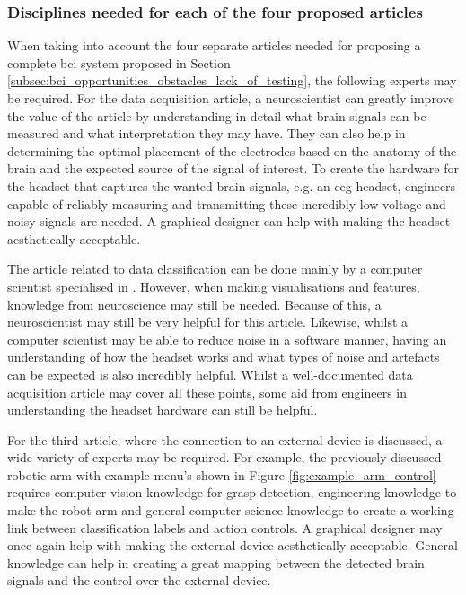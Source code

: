 
\subsubsection{Disciplines needed for each of the four proposed articles}
\label{subsubsec:bci_opportunities_obstacles_interdisciplinary_four_articles}


When taking into account the four separate articles needed for proposing a complete \gls{bci} system proposed in Section \ref{subsec:bci_opportunities_obstacles_lack_of_testing}, the following experts may be required.
For the data acquisition article, a neuroscientist can greatly improve the value of the article by understanding in detail what brain signals can be measured and what interpretation they may have.
They can also help in determining the optimal placement of the electrodes based on the anatomy of the brain and the expected source of the signal of interest.
To create the hardware for the headset that captures the wanted brain signals, e.g. an \gls{eeg} headset, engineers capable of reliably measuring and transmitting these incredibly low voltage and noisy signals are needed.
A graphical designer can help with making the headset aesthetically acceptable.

The article related to data classification can be done mainly by a computer scientist specialised in .
However, when making visualisations and features, knowledge from neuroscience may still be needed.
Because of this, a neuroscientist may still be very helpful for this article.
Likewise, whilst a computer scientist may be able to reduce noise in a software manner, having an understanding of how the headset works and what types of noise and artefacts can be expected is also incredibly helpful.
Whilst a well-documented data acquisition article may cover all these points, some aid from engineers in understanding the headset hardware can still be helpful.

For the third article, where the connection to an external device is discussed, a wide variety of experts may be required.
For example, the previously discussed robotic arm with example menu's shown in Figure \ref{fig:example_arm_control} requires computer vision knowledge for grasp detection, engineering knowledge to make the robot arm and general computer science knowledge to create a working link between classification labels and action controls.
A graphical designer may once again help with making the external device aesthetically acceptable.
General  knowledge can help in creating a great mapping between the detected brain signals and the control over the external device.


